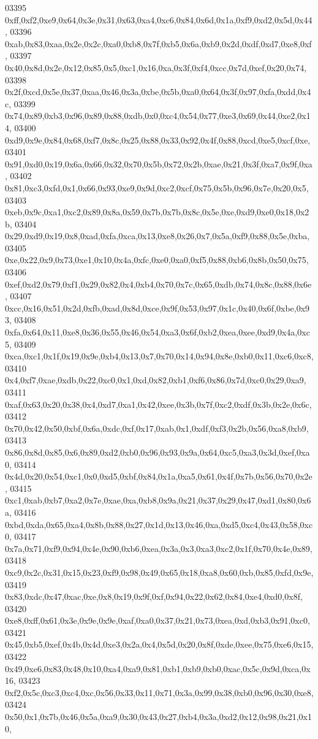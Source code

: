 \begin{DoxyCode}
03395   0xff,0xf2,0xe9,0x64,0x3e,0x31,0x63,0xa4,0xc6,0x84,0x6d,0x1a,0xf9,0xd2,0x5d,0x44,
03396   0xab,0x83,0xaa,0x2e,0x2c,0xa0,0xb8,0x7f,0xb5,0x6a,0xb9,0x2d,0xdf,0xd7,0xe8,0xf,
03397   0x40,0x8d,0x2e,0x12,0x85,0x5,0xc1,0x16,0xa,0x3f,0xf4,0xcc,0x7d,0xef,0x20,0x74,
03398   0x2f,0xcd,0x5e,0x37,0xaa,0x46,0x3a,0xbe,0x5b,0xa0,0x64,0x3f,0x97,0xfa,0xdd,0x4c,
03399   0x74,0x89,0xb3,0x96,0x89,0x88,0xdb,0x0,0xc4,0x54,0x77,0xe3,0x69,0x44,0xe2,0x14,
03400   0xd9,0x9e,0x84,0x68,0xf7,0x8c,0x25,0x88,0x33,0x92,0x4f,0x88,0xcd,0xe5,0xcf,0xe,
03401   0x91,0xd0,0x19,0x6a,0x66,0x32,0x70,0x5b,0x72,0x2b,0xae,0x21,0x3f,0xa7,0x9f,0xa,
03402   0x81,0xc3,0xfd,0x1,0x66,0x93,0xe9,0x9d,0xc2,0xcf,0x75,0x5b,0x96,0x7e,0x20,0x5,
03403   0xeb,0x9c,0xa1,0xc2,0x89,0x8a,0x59,0x7b,0x7b,0x8c,0x5e,0xe,0xd9,0xe0,0x18,0x2b,
03404   0x29,0xd9,0x19,0x8,0xad,0xfa,0xca,0x13,0xe8,0x26,0x7,0x5a,0xf9,0x88,0x5e,0xba,
03405   0xe,0x22,0x9,0x73,0xe1,0x10,0x4a,0xfc,0xe0,0xa0,0xf5,0x88,0xb6,0x8b,0x50,0x75,
03406   0xef,0xd2,0x79,0xf1,0x29,0x82,0x4,0xb4,0x70,0x7c,0x65,0xdb,0x74,0x8c,0x88,0x6e,
03407   0xcc,0x16,0x51,0x2d,0xfb,0xad,0x8d,0xce,0x9f,0x53,0x97,0x1c,0x40,0x6f,0xbe,0x93,
03408   0xfa,0x64,0x11,0xe8,0x36,0x55,0x46,0x54,0xa3,0x6f,0xb2,0xea,0xee,0xd9,0x4a,0xc5,
03409   0xca,0xc1,0x1f,0x19,0x9e,0xb4,0x13,0x7,0x70,0x14,0x94,0x8e,0xb0,0x11,0xc6,0xc8,
03410   0x4,0xf7,0xae,0xdb,0x22,0xc0,0x1,0xd,0x82,0xb1,0xf6,0x86,0x7d,0xc0,0x29,0xa9,
03411   0xaf,0x63,0x20,0x38,0x4,0xd7,0xa1,0x42,0xee,0x3b,0x7f,0xc2,0xdf,0x3b,0x2e,0x6c,
03412   0x70,0x42,0x50,0xbf,0x6a,0xdc,0xf,0x17,0xab,0x1,0xdf,0xf3,0x2b,0x56,0xa8,0xb9,
03413   0x86,0x8d,0x85,0x6,0x89,0xd2,0xb0,0x96,0x93,0x9a,0x64,0xc5,0xa3,0x3d,0xef,0xa0,
03414   0x4d,0x20,0x54,0xc1,0x0,0xd5,0xbf,0x84,0x1a,0xa5,0x61,0x4f,0x7b,0x56,0x70,0x2e,
03415   0xc1,0xab,0xb7,0xa2,0x7e,0xae,0xa,0xb8,0x9a,0x21,0x37,0x29,0x47,0xd1,0x80,0x6a,
03416   0xbd,0xda,0x65,0xa4,0x8b,0x88,0x27,0x1d,0x13,0x46,0xa,0xd5,0xc4,0x43,0x58,0xc0,
03417   0x7a,0x71,0xf9,0x94,0x4e,0x90,0xb6,0xea,0x3a,0x3,0xa3,0xc2,0x1f,0x70,0x4e,0x89,
03418   0xc9,0x2c,0x31,0x15,0x23,0xf9,0x98,0x49,0x65,0x18,0xa8,0x60,0xb,0x85,0xfd,0x9e,
03419   0x83,0xdc,0x47,0xac,0xe,0x8,0x19,0x9f,0xf,0x94,0x22,0x62,0x84,0xe4,0xd0,0x8f,
03420   0xe8,0xff,0x61,0x3e,0x9e,0x9e,0xaf,0xa0,0x37,0x21,0x73,0xea,0xd,0xb3,0x91,0xc0,
03421   0x45,0xb5,0xef,0x4b,0x4d,0xe3,0x2a,0x4,0x5d,0x20,0x8f,0xde,0xee,0x75,0xe6,0x15,
03422   0x49,0xe6,0x83,0x48,0x10,0xa4,0xa9,0x81,0xb1,0xb9,0xb0,0xac,0x5c,0x9d,0xca,0x16,
03423   0xf2,0x5c,0xc3,0xc4,0xc,0x56,0x33,0x11,0x71,0x3a,0x99,0x38,0xb0,0x96,0x30,0xe8,
03424   0x50,0x1,0x7b,0x46,0x5a,0xa9,0x30,0x43,0x27,0xb4,0x3a,0xd2,0x12,0x98,0x21,0x10,

\end{DoxyCode}

